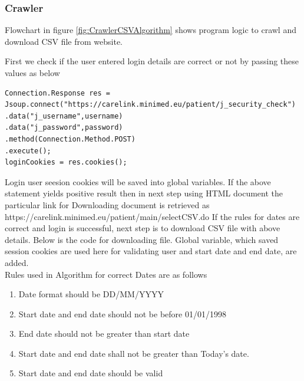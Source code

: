 \documentclass[article,type=msc,colorback,accentcolor=tud9c,twoside,11pt]{tudthesis}
\begin{document}
\subsubsection{Crawler}
 Flowchart in figure \ref{fig:CrawlerCSVAlgorithm} shows  program logic to crawl and download CSV file from website.

First we check if the user entered login details are correct or not by passing these values as below 
\begin{lstlisting}
Connection.Response res = 
Jsoup.connect("https://carelink.minimed.eu/patient/j_security_check")
.data("j_username",username)
.data("j_password",password)
.method(Connection.Method.POST)
.execute();
loginCookies = res.cookies();
\end{lstlisting}
Login user seesion cookies will be saved into global variables.
If the above statement yields positive result then in next step using HTML document the particular link for Downloading document is retrieved as https://carelink.minimed.eu/patient/main/selectCSV.do
If the rules for dates are correct and login is successful, next step is to download CSV file with above details. Below is the code for downloading file. Global variable, which saved session cookies are used here for validating user and start date and end date, are added.\\
Rules used in Algorithm for correct Dates are as follows
\begin{enumerate}
\item Date format should be DD/MM/YYYY
\item Start date and end date should not be before 01/01/1998
\item End date should not be greater than start date
\item Start date and end date shall not be greater than Today's date.
\item Start date and end date should be valid
\end{enumerate}
\end{document}
